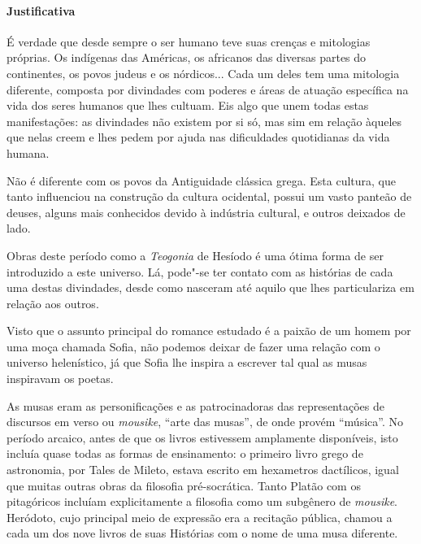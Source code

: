 \documentclass[12pt]{extarticle}
\begin{document}
\paragraph{Justificativa} É verdade que desde sempre o ser humano teve suas
crenças e mitologias próprias. Os indígenas das Américas, os africanos das diversas
partes do continentes, os povos judeus e os nórdicos... Cada um deles tem uma
mitologia diferente, composta por divindades com poderes e áreas de atuação
específica na vida dos seres humanos que lhes cultuam. Eis algo que unem todas
estas manifestações: as divindades não existem por si só, mas sim em relação 
àqueles que nelas creem e lhes pedem por ajuda nas dificuldades quotidianas da vida
humana. 







Não é diferente com os povos da Antiguidade clássica grega. Esta cultura, que tanto
influenciou na construção da cultura ocidental, possui um vasto panteão
de deuses, alguns mais conhecidos devido à indústria cultural, e outros
deixados de lado.

Obras deste período como a \textit{Teogonia} de Hesíodo é uma ótima forma de
ser introduzido a este universo. Lá, pode"-se ter contato com as histórias
de cada uma destas divindades, desde como nasceram até aquilo que lhes
particulariza em relação aos outros. 

Visto que o assunto principal do romance estudado é a paixão de um homem por
uma moça chamada Sofia, não podemos deixar de fazer uma relação com o universo 
helenístico, já que Sofia lhe inspira a escrever tal qual as musas inspiravam os
poetas.

As musas eram as personificações e as patrocinadoras das representações de discursos 
em verso ou \textit{mousike}, ``arte das musas'', de onde provém ``música''. No período 
arcaico, antes de que os livros estivessem amplamente disponíveis, isto incluía quase 
todas as formas de ensinamento: o primeiro livro grego de astronomia, por Tales de Mileto, 
estava escrito em hexametros dactílicos, igual que muitas outras obras da filosofia pré-socrática. 
Tanto Platão com os pitagóricos incluíam explicitamente a filosofia como um subgênero de 
\emph{mousike}. Heródoto, cujo principal meio de expressão era a recitação pública, chamou 
a cada um dos nove livros de suas Histórias com o nome de uma musa diferente.
\end{document}
